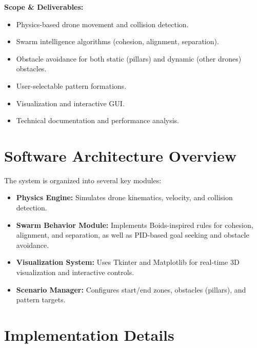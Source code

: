 \documentclass[11pt]{article}
\begin{document}
\textbf{Scope \& Deliverables:}
\begin{itemize}
    \item Physics-based drone movement and collision detection.
    \item Swarm intelligence algorithms (cohesion, alignment, separation).
    \item Obstacle avoidance for both static (pillars) and dynamic (other drones) obstacles.
    \item User-selectable pattern formations.
    \item Visualization and interactive GUI.
    \item Technical documentation and performance analysis.
\end{itemize}


\section{Software Architecture Overview}
The system is organized into several key modules:

\begin{itemize}
    \item \textbf{Physics Engine:} Simulates drone kinematics, velocity, and collision detection.
    \item \textbf{Swarm Behavior Module:} Implements Boids-inspired rules for cohesion, alignment, and separation, as well as PID-based goal seeking and obstacle avoidance.
    \item \textbf{Visualization System:} Uses Tkinter and Matplotlib for real-time 3D visualization and interactive controls.
    \item \textbf{Scenario Manager:} Configures start/end zones, obstacles (pillars), and pattern targets.
\end{itemize}

\section{Implementation Details}
\end{document}

